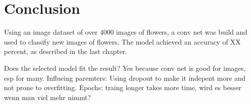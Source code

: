 \chapter{Conclusion}

Using an image dataset of over 4000 images of flowers, a conv net was build and used to classify new images of flowers. The model achieved an accuracy of XX percent, as described in the last chapter. 

Does the selected model fit the result? Yes because conv net is good for images, esp for many.
Influeing paremters: Using dropout to make it indepent more and not prone to overfitting.
Epochs: traing longer takes more time, wird es besser wenn man viel mehr nimmt?